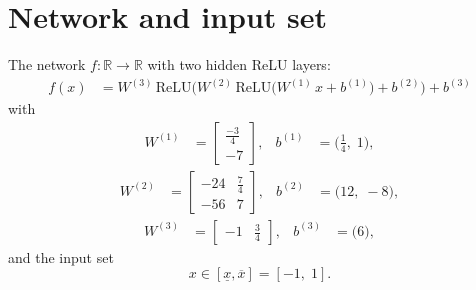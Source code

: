 \documentclass[11pt]{article}
\begin{document}
\section{Network and input set}
The network $f:\mathbb{R} \to \mathbb{R}$ with two hidden ReLU layers:
\begin{align*}
f(x) &= W^{(3)}\,\mathrm{ReLU}\bigl(W^{(2)}\,\mathrm{ReLU}\bigl(W^{(1)}\,x + b^{(1)}\bigr) + b^{(2)}\bigr) + b^{(3)}
\end{align*}
with
\begin{align*}
W^{(1)} &= \begin{bmatrix}
\frac{-3}{4} \\
-7
\end{bmatrix}, & b^{(1)} &= \bigl(\frac{1}{4},\; 1\bigr),
\end{align*}
\begin{align*}
W^{(2)} &= \begin{bmatrix}
-24 & \frac{7}{4} \\
-56 & 7
\end{bmatrix}, & b^{(2)} &= \bigl(12,\; -8\bigr),
\end{align*}
\begin{align*}
W^{(3)} &= \begin{bmatrix}
-1 & \frac{3}{4}
\end{bmatrix}, & b^{(3)} &= \bigl(6\bigr),
\end{align*}
and the input set
\begin{equation*}
 x \in [\underline{x}, \overline{x}] = [-1,\; 1].
\end{equation*}
\end{document}

